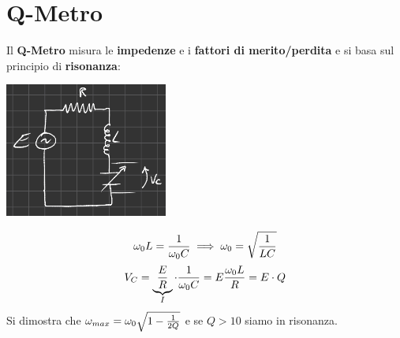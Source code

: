 \chapter{Q-Metro}
Il \textbf{Q-Metro} misura le \textbf{impedenze} e i \textbf{fattori di merito/perdita} e si basa sul principio di \textbf{risonanza}:
  \begin{center}
    \includegraphics[width=0.40\textwidth]{Images/figure23.png}
  \end{center}
\begin{equation*}
    \omega_0 L = \frac{1}{\omega_0 C} \implies \omega_0 = \sqrt{\frac{1}{LC}}
\end{equation*}
\begin{equation*}
    V_C = \underbrace{\frac{E}{R}}_{I} \cdot \frac{1}{\omega_0 C} = E \frac{\omega_0 L}{R} = E \cdot Q
\end{equation*}
Si dimostra che $\omega_{max} = \omega_0 \sqrt{1 - \frac{1}{2Q}}$ e se $Q > 10$ siamo in risonanza.\\ 
